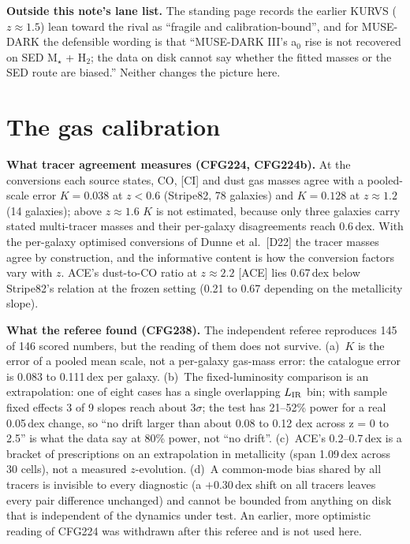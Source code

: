 \documentclass[10pt]{article}
\begin{document}
\textbf{Outside this note's lane list.} The standing page records the earlier KURVS ($z\approx1.5$) lean toward the rival as ``fragile and calibration-bound'', and for MUSE-DARK the defensible wording is that ``MUSE-DARK III's a$_0$ rise is not recovered on SED M$_\star$ + H$_2$; the data on disk cannot say whether the fitted masses or the SED route are biased.'' Neither changes the picture here.

\section{The gas calibration}\label{sec:gas}

\textbf{What tracer agreement measures (CFG224, CFG224b).} At the conversions each source states, CO, [CI] and dust gas masses agree with a pooled-scale error $K=0.038$ at $z<0.6$ (Stripe82, 78 galaxies) and $K=0.128$ at $z\approx1.2$ (14 galaxies); above $z\approx1.6$ $K$ is not estimated, because only three galaxies carry stated multi-tracer masses and their per-galaxy disagreements reach 0.6\,dex. With the per-galaxy optimised conversions of Dunne et al.\ [D22] the tracer masses agree by construction, and the informative content is how the conversion factors vary with $z$. ACE's dust-to-CO ratio at $z\approx2.2$ [ACE] lies 0.67\,dex below Stripe82's relation at the frozen setting (0.21 to 0.67 depending on the metallicity slope).

\textbf{What the referee found (CFG238).} The independent referee reproduces 145 of 146 scored numbers, but the reading of them does not survive. (a)~$K$ is the error of a pooled mean scale, not a per-galaxy gas-mass error: the catalogue error is 0.083 to 0.111\,dex per galaxy. (b)~The fixed-luminosity comparison is an extrapolation: one of eight cases has a single overlapping $L_{\rm IR}$ bin; with sample fixed effects 3 of 9 slopes reach about 3$\sigma$; the test has 21--52\% power for a real 0.05\,dex change, so ``no drift larger than about 0.08 to 0.12 dex across z = 0 to 2.5'' is what the data say at 80\% power, not ``no drift''. (c)~ACE's 0.2--0.7\,dex is a bracket of prescriptions on an extrapolation in metallicity (span 1.09\,dex across 30 cells), not a measured $z$-evolution. (d)~A common-mode bias shared by all tracers is invisible to every diagnostic (a $+0.30$\,dex shift on all tracers leaves every pair difference unchanged) and cannot be bounded from anything on disk that is independent of the dynamics under test. An earlier, more optimistic reading of CFG224 was withdrawn after this referee and is not used here.
\end{document}
